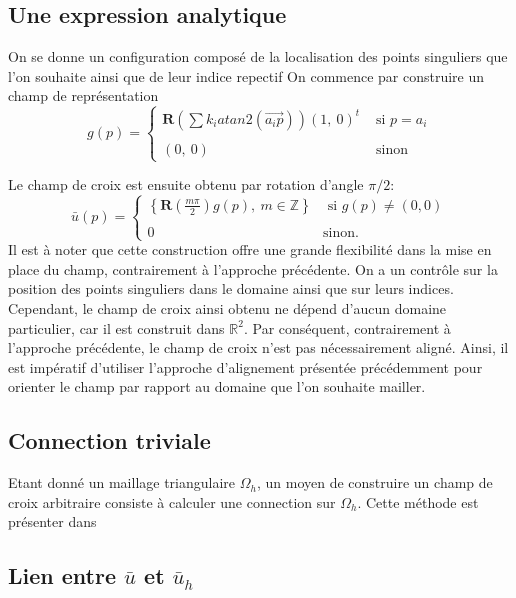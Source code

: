 \subsection{Une expression analytique}

On se donne un configuration composé de la localisation des points singuliers que l'on souhaite ainsi que de leur indice repectif
On commence par construire un champ de représentation
\begin{equation}
g(p)=
\left\{
\begin{array}{ll}
\mathbf{R}\left(\displaystyle\sum k_i atan2(\overrightarrow{a_ip})\right)(1,~0)^t&\mbox{ si }p=a_i\\\\
(0,~0) &\mbox{ sinon }
\end{array}
\right.
\end{equation}

Le champ de croix est ensuite obtenu par rotation d'angle $\pi/2$:
\begin{equation}
\bar{u}(p)=
\left\{
\begin{array}{ll}
\displaystyle\left\{\mathbf{R}\left(\frac{m\pi}{2}\right)g(p),~ m\in \mathbb{Z}\right\} &\mbox{ si }g(p)\neq (0,0)\\\\
0& \text{sinon}.
\end{array}
\right.
\end{equation}
Il est à noter que cette construction offre une grande flexibilité dans la mise en place du champ, contrairement à l'approche précédente. On a un contrôle sur la position des points singuliers dans le domaine ainsi que sur leurs indices. Cependant, le champ de croix ainsi obtenu ne dépend d'aucun domaine particulier, car il est construit dans $\mathbb{R}^2$. Par conséquent, contrairement à l'approche précédente, le champ de croix n'est pas nécessairement aligné. Ainsi, il est impératif d'utiliser l'approche d'alignement présentée précédemment pour orienter le champ par rapport au domaine que l'on souhaite mailler.
\subsection{Connection triviale}

Etant donné un maillage triangulaire $\Omega_h$, un moyen de construire un champ de croix arbitraire consiste à calculer une connection sur $\Omega_h$. Cette méthode est présenter dans



\subsection{Lien entre $\bar{u}$ et $\bar{u}_h$}

